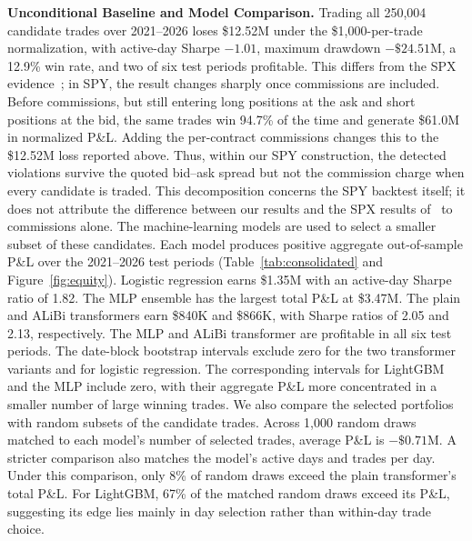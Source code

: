 \documentclass[sigconf,review]{acmart}
\begin{document}
\smallskip\noindent\textbf{Unconditional Baseline and Model Comparison.}
Trading all 250{,}004 candidate trades over 2021--2026 loses \$12.52M under the \$1{,}000-per-trade normalization, with active-day Sharpe $-1.01$, maximum drawdown $-\$24.51$M, a 12.9\% win rate, and two of six test periods profitable.
This differs from the SPX evidence~\cite{glasserman2025tp2}; in SPY, the result changes sharply once commissions are included. Before commissions, but still entering long positions at the ask and short positions at the bid, the same trades win 94.7\% of the time and generate \$61.0M in normalized P\&L. Adding the per-contract commissions changes this to the \$12.52M loss reported above. Thus, within our SPY construction, the detected violations survive the quoted bid--ask spread but not the commission charge when every candidate is traded. This decomposition concerns the SPY backtest itself; it does not attribute the difference between our results and the SPX results of~\cite{glasserman2025tp2} to commissions alone.
The machine-learning models are used to select a smaller subset of these candidates. Each model produces positive aggregate out-of-sample P\&L over the 2021--2026 test periods (Table~\ref{tab:consolidated} and Figure~\ref{fig:equity}). Logistic regression earns \$1.35M with an active-day Sharpe ratio of 1.82. The MLP ensemble has the largest total P\&L at \$3.47M. The plain and ALiBi transformers earn \$840K and \$866K, with Sharpe ratios of 2.05 and 2.13, respectively. The MLP and ALiBi transformer are profitable in all six test periods.
The date-block bootstrap intervals exclude zero for the two transformer variants and for logistic regression. The corresponding intervals for LightGBM and the MLP include zero, with their aggregate P\&L more concentrated in a smaller number of large winning trades.
We also compare the selected portfolios with random subsets of the candidate trades. Across 1{,}000 random draws matched to each model's number of selected trades, average P\&L is $-\$0.71$M. A stricter comparison also matches the model's active days and trades per day. Under this comparison, only 8\% of random draws exceed the plain transformer's total P\&L. For LightGBM, 67\% of the matched random draws exceed its P\&L, suggesting its edge lies mainly in day selection rather than within-day trade choice.
\end{document}
